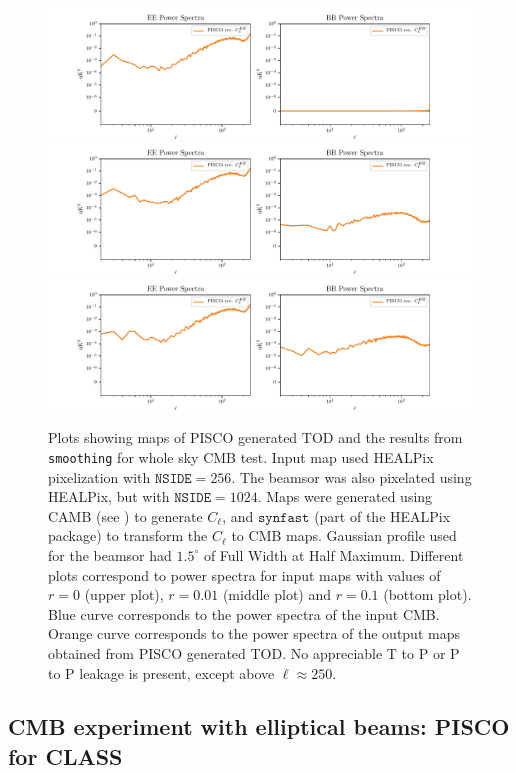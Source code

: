 \documentclass[a4paper,11pt]{article}
\begin{document}
\begin{figure}
	\centering
	\includegraphics[width=1\linewidth]{figures/ps_r0d00.pdf}
	\includegraphics[width=1\linewidth]{figures/ps_r0d01.pdf}
	\includegraphics[width=1\linewidth]{figures/ps_r0d10.pdf}
	\caption{Plots showing maps of PISCO generated TOD and the results from \texttt{smoothing} for whole sky CMB test. Input map used HEALPix pixelization with $\mathrm{\texttt{NSIDE}} = 256$. The beamsor was also pixelated using HEALPix, but with $\mathrm{\texttt{NSIDE}} = 1024$. Maps were generated using CAMB (see \cite{Lewis:2002ah}) to generate $C_\ell$, and $\texttt{synfast}$ (part of the HEALPix package) to transform the $C_\ell$ to CMB maps. Gaussian profile used for the beamsor had $1.5^\circ$ of Full Width at Half Maximum. Different plots correspond to power spectra for input maps with values of $r=0$ (upper plot), $r=0.01$ (middle plot) and $r=0.1$ (bottom plot). Blue curve corresponds to the power spectra of the input CMB. Orange curve corresponds to the power spectra of the output maps obtained from PISCO generated TOD. No appreciable T to P or P to P leakage is present, except above $\ell \approx 250$.}
	\label{fig::pisco4wholesky}
\end{figure}

%
\subsection{CMB experiment with elliptical beams: PISCO for CLASS}
\label{sec::realistic_cmb_experiment}
\end{document}
